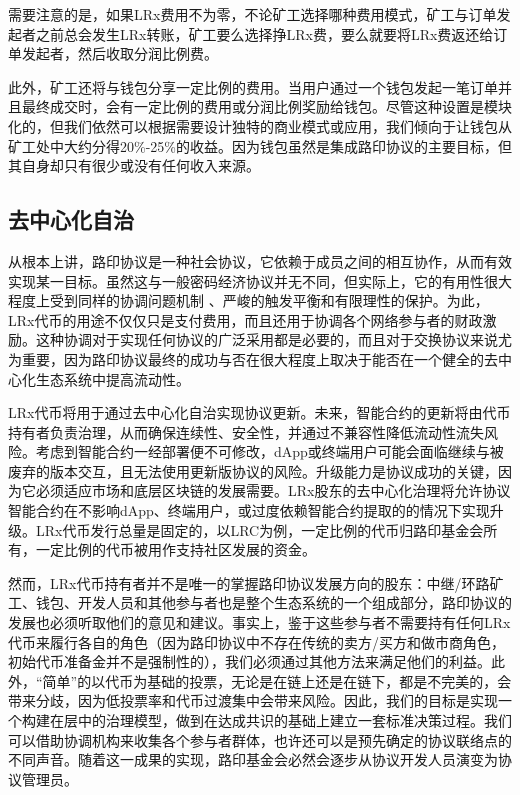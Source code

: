 \documentclass[UTF8]{ctexart}
\begin{document}
\begin{multicols}{2}
需要注意的是，如果LRx费用不为零，不论矿工选择哪种费用模式，矿工与订单发起者之前总会发生LRx转账，矿工要么选择挣LRx费，要么就要将LRx费返还给订单发起者，然后收取分润比例费。

此外，矿工还将与钱包分享一定比例的费用。当用户通过一个钱包发起一笔订单并且最终成交时，会有一定比例的费用或分润比例奖励给钱包。尽管这种设置是模块化的，但我们依然可以根据需要设计独特的商业模式或应用，我们倾向于让钱包从矿工处中大约分得20\%-25\%的收益。因为钱包虽然是集成路印协议的主要目标，但其自身却只有很少或没有任何收入来源。

\subsection{去中心化自治}
从根本上讲，路印协议是一种社会协议，它依赖于成员之间的相互协作，从而有效实现某一目标。虽然这与一般密码经济协议并无不同，但实际上，它的有用性很大程度上受到同样的协调问题机制 \cite{vitalikgovernance}、严峻的触发平衡和有限理性的保护。为此，LRx代币的用途不仅仅只是支付费用，而且还用于协调各个网络参与者的财政激励。这种协调对于实现任何协议的广泛采用都是必要的，而且对于交换协议来说尤为重要，因为路印协议最终的成功与否在很大程度上取决于能否在一个健全的去中心化生态系统中提高流动性。

LRx代币将用于通过去中心化自治实现协议更新。未来，智能合约的更新将由代币持有者负责治理，从而确保连续性、安全性，并通过不兼容性降低流动性流失风险。考虑到智能合约一经部署便不可修改，dApp或终端用户可能会面临继续与被废弃的版本交互，且无法使用更新版协议的风险。升级能力是协议成功的关键，因为它必须适应市场和底层区块链的发展需要。LRx股东的去中心化治理将允许协议智能合约在不影响dApp、终端用户，或过度依赖智能合约提取的的情况下实现升级。LRx代币发行总量是固定的，以LRC为例，一定比例的代币归路印基金会所有，一定比例的代币被用作支持社区发展的资金。

然而，LRx代币持有者并不是唯一的掌握路印协议发展方向的股东：中继/环路矿工、钱包、开发人员和其他参与者也是整个生态系统的一个组成部分，路印协议的发展也必须听取他们的意见和建议。事实上，鉴于这些参与者不需要持有任何LRx代币来履行各自的角色（因为路印协议中不存在传统的卖方/买方和做市商角色，初始代币准备金并不是强制性的），我们必须通过其他方法来满足他们的利益。此外，“简单”的以代币为基础的投票，无论是在链上还是在链下，都是不完美的，会带来分歧，因为低投票率和代币过渡集中会带来风险。因此，我们的目标是实现一个构建在层中的治理模型，做到在达成共识的基础上建立一套标准决策过程。我们可以借助协调机构来收集各个参与者群体，也许还可以是预先确定的协议联络点的不同声音。随着这一成果的实现，路印基金会必然会逐步从协议开发人员演变为协议管理员。


\end{multicols}
\end{document}
